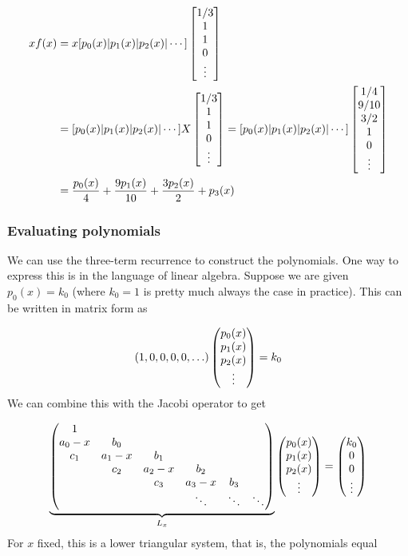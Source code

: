\documentclass[12pt,a4paper]{article}
\begin{document}
\begin{align*}
x f(x) &= x[p_0(x) | p_1(x) | p_2(x) | \ensuremath{\cdots}] \begin{bmatrix} 1/3 \\ 1 \\ 1 \\ 0 \\ \ensuremath{\vdots} \end{bmatrix} \\
&= [p_0(x) | p_1(x) | p_2(x) | \ensuremath{\cdots}] X \begin{bmatrix} 1/3 \\ 1 \\ 1 \\ 0 \\ \ensuremath{\vdots} \end{bmatrix}
= [p_0(x) | p_1(x) | p_2(x) | \ensuremath{\cdots}]  \begin{bmatrix} 1/4 \\ 9/10 \\ 3/2 \\ 1 \\ 0 \\ \ensuremath{\vdots} \end{bmatrix} \\
&= {p_0(x) \over 4} + {9 p_1(x) \over 10} + {3 p_2(x) \over 2} + p_3(x)
\end{align*}
\subsubsection{Evaluating polynomials}
We can use the three-term recurrence to construct the polynomials. One way to express this is in the language of linear algebra. Suppose we are given $p_0(x) = k_0$ (where $k_0 = 1$ is pretty much always the case in practice). This can be written in matrix form as

\[
(1,0,0,0,0,\ldots) \begin{pmatrix} p_0(x) \cr p_1(x) \cr p_2(x) \cr \vdots \end{pmatrix} = k_0
\]
We can combine this with the Jacobi operator to get

\[
\underbrace{\begin{pmatrix}
1 \\
a_0-x & b_0 \\
c_1 & a_1-x & b_1 \\
& c_2 & a_2-x & b_2 \cr
&& c_3 & a_3-x & b_3 \cr
&&&\ddots & \ddots & \ddots
\end{pmatrix}}_{L_x} \begin{pmatrix} p_0(x) \cr p_1(x) \cr p_2(x) \cr \vdots \end{pmatrix} = \begin{pmatrix} k_0\cr 0 \cr 0 \cr \vdots \end{pmatrix}
\]
For $x$ fixed, this is a lower triangular system, that is, the polynomials equal
\end{document}
